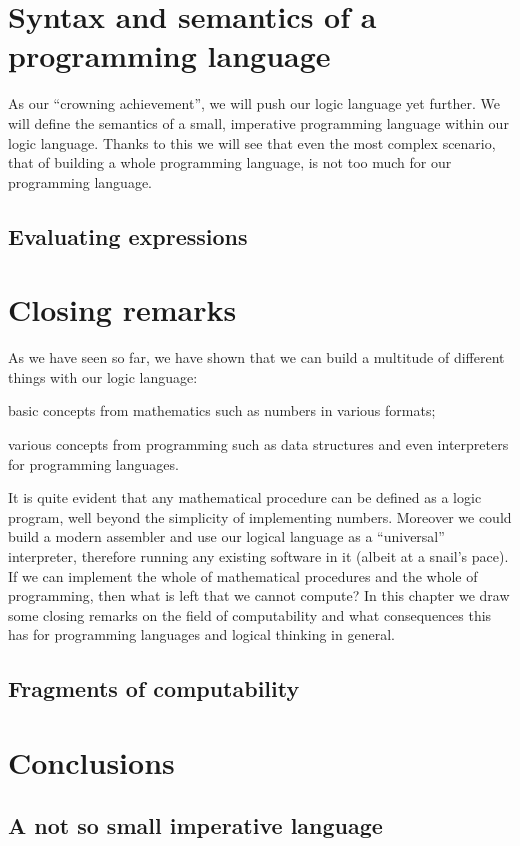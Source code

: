\documentclass[12pt,b5paper]{book}
\theoremstyle{definition}
\begin{document}
\chapter{Syntax and semantics of a programming language}
\label{chap:aPL}
As our ``crowning achievement'', we will push our logic language yet further. We will define the semantics of a small, imperative programming language within our logic language. Thanks to this we will see that even the most complex scenario, that of building a whole programming language, is not too much for our programming language.


\section{Evaluating expressions}
\label{sec:evaluatingExpressions}



\chapter{Closing remarks}
\label{chap:closingRemarks}
As we have seen so far, we have shown that we can build a multitude of different things with our logic language:
\begin{inparaenum}
\item basic concepts from mathematics such as numbers in various formats;
\item various concepts from programming such as data structures and even interpreters for programming languages.
\end{inparaenum}

It is quite evident that any mathematical procedure can be defined as a logic program, well beyond the simplicity of implementing numbers.
Moreover we could build a modern assembler and use our logical language as a ``universal'' interpreter, therefore running any existing software in it (albeit at a snail's pace). If we can implement the whole of mathematical procedures and the whole of programming, then what is left that we cannot compute? In this chapter we draw some closing remarks on the field of computability and what consequences this has for programming languages and logical thinking in general.


\section{Fragments of computability}
\label{sec:computability}



\chapter{Conclusions}



\begin{appendices}
\chapter{A not so small imperative language}



\end{appendices}
\end{document}
